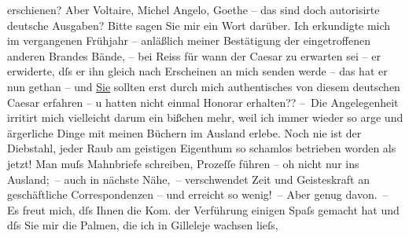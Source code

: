 \begin{ledgroupsized}[t]{13cm}
               erschienen? Aber Voltaire, Michel Angelo, Goethe – das
               sind doch autorisirte deutsche Ausgaben? Bitte sagen Sie mir ein Wort darüber. Ich
               erkundigte mich im vergangenen Frühjahr – anläßlich meiner Bestätigung der
               eingetroffenen anderen Brandes Bände, – \introOben{}bei Reiss\introOben{} für wann der Caesar zu erwarten sei – er
               erwiderte, dſs er ihn gleich nach Erscheinen an mich senden werde – das hat er {\pb}nun gethan – und \uline{Sie} sollten erst durch mich authentisches von diesem deutschen Caesar erfahren – u hatten nicht einmal Honorar
               erhalten??\pend
           \pstart
           – Die Angelegenheit irritirt mich vielleicht darum ein bißchen mehr, weil ich immer
               wieder so arge und ärgerliche Dinge mit meinen Büchern im Ausland erlebe. Noch nie
               ist der Diebstahl, jeder Raub am geistigen Eigenthum so schamlos betrieben worden als
               jetzt! Man muſs Mahnbriefe schreiben, Prozeſſe führen – oh nicht nur ins Ausland; –
               auch in nächste Nähe, – verschwendet Zeit und Geisteskraft an geschäftliche
               Correspondenzen – und erreicht so wenig! – Aber genug davon. –\pend
           \pstart
           Es freut mich, dſs Ihnen die Kom. der Verführung
               einigen Spaſs gemacht hat und dſs Sie mir die Palmen, die ich in Gilleleje wachsen {\pb}lieſs,

\end{ledgroupsized}
